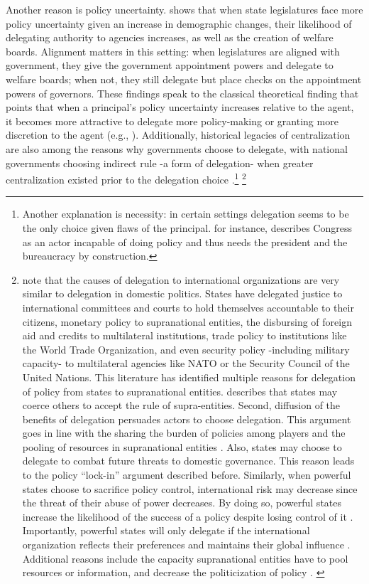 \documentclass[12pt]{amsart}
\numberwithin{equation}{section}
\theoremstyle{definition}
\theoremstyle{definition}
\theoremstyle{definition}
\begin{document}
 Another reason is policy uncertainty. \citet{volden_2002} shows that when state legislatures face more policy uncertainty given an increase in demographic changes, their likelihood of delegating authority to agencies increases, as well as the creation of welfare boards. Alignment matters in this setting: when legislatures are aligned with government, they give the government appointment powers and delegate to welfare boards; when not, they still delegate but place checks on the appointment powers of governors. These findings speak to the classical theoretical finding that points that when a principal's policy uncertainty increases relative to the agent, it becomes more attractive to delegate more policy-making or granting more discretion to the agent (e.g., \citet{epstein_halloran_1994, epstein_halloran_1999, bawn_1995}). Additionally, historical legacies of centralization are also among the reasons why governments choose to delegate, with national governments choosing indirect rule -a form of delegation- when greater centralization existed prior to the delegation choice \citep{gerring_etal_2011}.\footnote{Another explanation is necessity: in certain settings delegation seems to be the only choice given flaws of the principal. \citet{huntington_1995} for instance, describes Congress as an actor incapable of doing policy and thus needs the president and the bureaucracy by construction.} \footnote{\citet{Hawkins_etal_2006} note that the causes of delegation to international organizations are very similar to delegation in domestic politics. States have delegated justice to international committees and courts to hold themselves accountable to their citizens, monetary policy to supranational entities, the disbursing of foreign aid and credits to multilateral institutions, trade policy to institutions like the World Trade Organization, and even security policy -including military capacity- to multilateral agencies like NATO or the Security Council of the United Nations. This literature has identified multiple reasons for delegation of policy from states to supranational entities. \citet{Moravcsik_2000} describes that states may coerce others to accept the rule of supra-entities. Second, diffusion of the benefits of delegation persuades actors to choose delegation. This argument goes in line with the sharing the burden of policies among players and the pooling of resources in supranational entities \citep{milner_2011}. Also, states may choose to delegate to combat future threats to domestic governance. This reason leads to the policy ``lock-in'' argument described before. Similarly, when powerful states choose to sacrifice policy control, international risk may decrease since the threat of their abuse of power decreases. By doing so, powerful states increase the likelihood of the success of a policy despite losing control of it \citep{lake_2009, milner_2011}. Importantly, powerful states will only delegate if the international organization reflects their preferences and maintains their global influence \citep{Hawkins_etal_2006}. Additional reasons include the capacity supranational entities have to pool resources or information, and decrease the politicization of policy \citet{Rodrick_1996}. \label{footnote:international_delegation}} 
\end{document}
